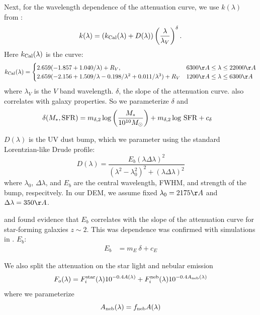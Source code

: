 Next, for the wavelength dependence of the attenuation curve, we use $k(\lambda)$ from 
\cite{noll2009}: 
\begin{equation}
    k(\lambda) = \left(k_{\rm Cal}(\lambda) + D(\lambda)\right) \left(
    \frac{\lambda}{\lambda_V} \right)^\delta.
\end{equation}
Here $k_{\rm Cal}(\lambda)$ is the \cite{calzetti2001} curve: 
\[
    k_{\rm Cal}(\lambda) = 
    \begin{cases} 
        2.659 (-1.857 + 1.040/\lambda) + R_V, & 6300 \AA \le \lambda \le
        22000 \AA \\ 
        2.659 (-2.156 + 1.509/\lambda - 0.198/\lambda^2 + 0.011/\lambda^3) +
        R_V & 1200 \AA \le \lambda \le 6300 \AA
    \end{cases}
\]
where $\lambda_V$ is the $V$ band wavelength. $\delta$, the slope of the attenuation curve.
also correlates with galaxy
properties.
So we parameterize $\delta$ and 
\begin{align}
    \delta(M_*, {\rm SFR}) &= m_{\delta,2} \log \left(\frac{M_*}{10^{10}
    M_\odot}\right) + m_{\delta,2} \log\,{\rm SFR} + c_\delta 
\end{align}

$D(\lambda)$ is the UV dust bump, which we
parameter using the standard Lorentzian-like Drude profile:
\begin{equation}
    D(\lambda) = \frac{E_b(\lambda \Delta \lambda)^2}{(\lambda^2 -
    \lambda_0^2)^2 + (\lambda \Delta \lambda)^2}
\end{equation}
where $\lambda_0$, $\Delta \lambda$, and $E_b$ are the central wavelength,
FWHM, and strength of the bump, respecitvely. In our DEM, we assume fixed 
$\lambda_0 = 2175 \AA$ and $\Delta \lambda = 350\AA$. 

\cite{kriek2013} and \cite{tress2018} found evidence that $E_b$ correlates with
the slope of the attenuation curve for star-forming galaxies $z\sim2$. This was
dependence was confirmed with simulations in \cite{naranyanan2018}. $E_b$: 
\begin{align}
    E_b &= m_E~\delta + c_E
\end{align}

We also split the attenuation on the star light and nebular emission 
\begin{equation} 
    F_o (\lambda) = F^{\rm star}_i (\lambda) 10^{-0.4 A(\lambda)} + F^{\rm
    neb}_i (\lambda) 10^{-0.4 A_{\rm neb}(\lambda)}
\end{equation}
where we parameterize
\begin{equation}
    A_{\rm neb}(\lambda) = f_{\rm neb}  A(\lambda) 
\end{equation} 

